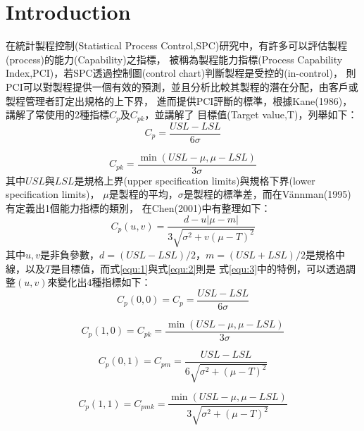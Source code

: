 \chapter{Introduction}
\label{chapter:intro}

在統計製程控制(Statistical Process Control,SPC)研究中，有許多可以評估製程(process)的能力(Capability)之指標，
被稱為製程能力指標(Process Capability Index,PCI)，若SPC透過控制圖(control chart)判斷製程是受控的(in-control)，
則PCI可以對製程提供一個有效的預測，並且分析比較其製程的潛在分配，由客戶或製程管理者訂定出規格的上下界，
進而提供PCI評斷的標準，根據Kane(1986)\cite{Kane_1986}，講解了常使用的2種指標$C_{p}$及$C_{pk}$，並講解了
目標值(Target value,T)，列舉如下：
\begin{equation}\label{equ:1}
    C_{p}=\frac{USL-LSL}{6\sigma}
\end{equation}

\begin{equation}\label{equ:2}
    C_{pk}=\frac{\min(USL-\mu, \mu-LSL)}{3\sigma}
\end{equation}
其中$USL$與$LSL$是規格上界(upper specification limits)與規格下界(lower specification limits)，
$\mu$是製程的平均，$\sigma$是製程的標準差，而在Vännman(1995)\cite{Vannman_1995}有定義出1個能力指標的類別，
在Chen(2001)中有整理如下：
\begin{equation}\label{equ:3}
    C_{p}(u, v)=\frac{d-u|\mu-m|}{3\sqrt{\sigma^{2}+v(\mu-T)^{2}}}
\end{equation}
其中$u,v$是非負參數，$d=(USL-LSL)/2$，$m=(USL+LSL)/2$是規格中線，以及$T$是目標值，而式\ref{equ:1}與式\ref{equ:2}則是
式\ref{equ:3}中的特例，可以透過調整$(u,v)$來變化出4種指標如下：
\begin{equation}\label{equ:4}
    C_{p}(0, 0)= C_{p}=\frac{USL-LSL}{6\sigma}
\end{equation}

\begin{equation}\label{equ:5}
    C_{p}(1, 0)=C_{pk}=\frac{\min(USL-\mu, \mu-LSL)}{3\sigma}
\end{equation}

\begin{equation}\label{equ:6}
    C_{p}(0, 1)=C_{pm}=\frac{USL-LSL}{6\sqrt{\sigma^{2}+(\mu-T)^{2}}}
\end{equation}

\begin{equation}\label{equ:7}
    C_{p}(1, 1)=C_{pmk}=\frac{\min(USL-\mu, \mu-LSL)}{3\sqrt{\sigma^{2}+(\mu-T)^{2}}}
\end{equation}

